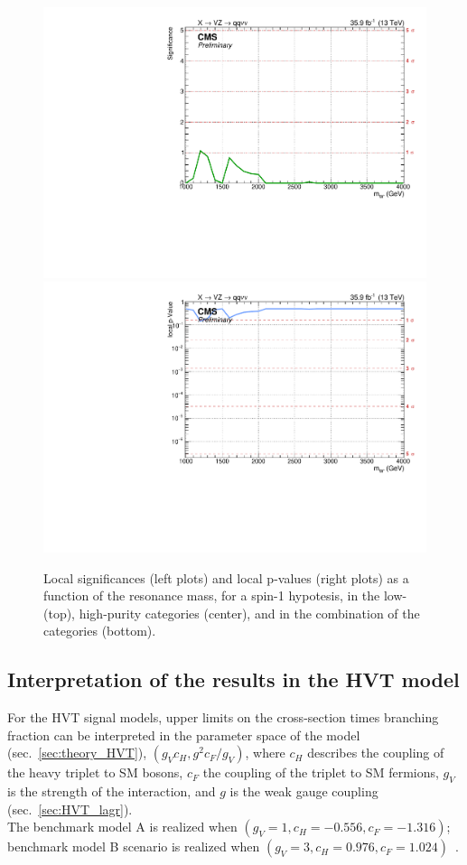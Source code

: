 \begin{figure}[!htb]
\begin{center}
     \includegraphics[width=.495\textwidth]{v9/plotsAlpha/Limits/Significance_XWZInv_XVZnn.pdf}%
     \includegraphics[width=.495\textwidth]{v9/plotsAlpha/Limits/pValue_XWZInv_XVZnn.pdf}
  \end{center}
  \caption{Local significances (left plots) and local p-values (right plots) as a function of the resonance mass, for a spin-1 \Wp hypotesis, in the low- (top), high-purity categories (center), and in the combination of the categories (bottom).}
  \label{fig:Signif_XWZInv}
\end{figure}


\clearpage 

\subsection{Interpretation of the results in the HVT model}

For the HVT signal models, upper limits on the cross-section times branching fraction can be interpreted in the parameter space of the model (sec.~\ref{sec:theory_HVT}), $\left( g_V c_H, g^2 c_F /g_V \right)$, where $c_H$ describes the coupling of the heavy triplet to SM bosons, $c_F$ the coupling of the triplet to SM fermions, $g_V$ is the strength of the interaction, and $g$ is the weak gauge coupling (sec.~\ref{sec:HVT_lagr}).\\
The benchmark model A is realized when $\left( g_V = 1, c_H = -0.556, c_F = -1.316 \right)$; benchmark model B scenario is realized when $\left( g_V = 3, c_H = 0.976, c_F = 1.024 \right)$~\cite{Pappadopulo2014}.

